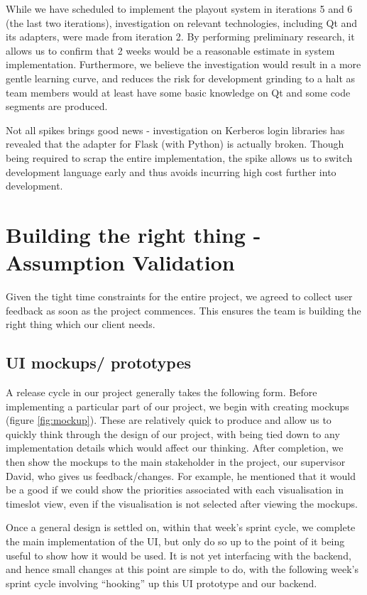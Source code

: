 \documentclass[a4paper]{article}
\begin{document}
While we have scheduled to implement the playout system in iterations 5 and 6
(the last two iterations),
investigation on relevant technologies, including Qt and its adapters, were
made from iteration 2. By performing preliminary research, it allows 
us to confirm that 2 weeks would be a reasonable estimate in system 
implementation. Furthermore, we believe the investigation would result 
in a more gentle learning curve, and reduces the risk for development 
grinding to a halt as team members would
at least have some basic knowledge on Qt and some code segments are produced.

Not all spikes brings good news - investigation on Kerberos login libraries has
revealed that the adapter for Flask (with Python) is actually broken.
Though being required to scrap the entire implementation, the spike allows us
to switch development language early and thus avoids incurring high 
cost further into development.

\section{Building the right thing - Assumption Validation}
Given the tight time constraints for the entire project, we agreed to collect
user feedback as soon as the project commences. This ensures the team
is building the right thing which our client needs.

\subsection{UI mockups/ prototypes}
A release cycle in our project generally takes the following form. Before
 implementing a particular part of our project, we begin with creating
 mockups (figure \ref{fig:mockup}). These are relatively quick to produce
 and allow us to quickly think through the design of our project,
 with being tied down to any implementation details which would affect
 our thinking. After completion, we then show the mockups to the main
 stakeholder in the project, our supervisor David, who gives us
 feedback/changes. For example, he mentioned that it would be a good if we could 
show the priorities associated with each visualisation in timeslot view, 
even if the visualisation is not selected after viewing the mockups.

Once a general design is settled on, within that week's
sprint cycle, we complete the main implementation of the UI, but only do 
so up to the point of it being useful to show how it would be used. It is
not yet interfacing with the backend, and hence small changes at this 
point are simple to do, with the following week's sprint cycle involving
``hooking'' up this UI prototype and our backend.
\end{document}
